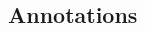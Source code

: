 \begin{frame}[fragile]
\begin{columns}
  \begin{column}{3.5cm}
    \begin{overlayarea}{3.5cm}{7cm}
    \end{overlayarea}
  \end{column}

\end{columns}

\end{frame}

\subsection*{Annotations}

